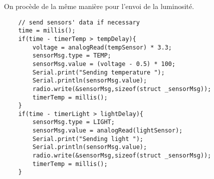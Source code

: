 On procède de la même manière pour l'envoi de la luminosité.

\bigbreak
\begin{DDbox}{\linewidth}
\begin{lstlisting}
	// send sensors' data if necessary
	time = millis();
	if(time - timerTemp > tempDelay){
		voltage = analogRead(tempSensor) * 3.3;
		sensorMsg.type = TEMP;
		sensorMsg.value = (voltage - 0.5) * 100;
		Serial.print("Sending temperature ");
		Serial.println(sensorMsg.value);
		radio.write(&sensorMsg,sizeof(struct _sensorMsg));
		timerTemp = millis();
	}
	if(time - timerLight > lightDelay){
		sensorMsg.type = LIGHT;
		sensorMsg.value = analogRead(lightSensor);
		Serial.print("Sending light ");
		Serial.println(sensorMsg.value);
		radio.write(&sensorMsg,sizeof(struct _sensorMsg));
		timerTemp = millis();
	}
\end{lstlisting}
\end{DDbox}
